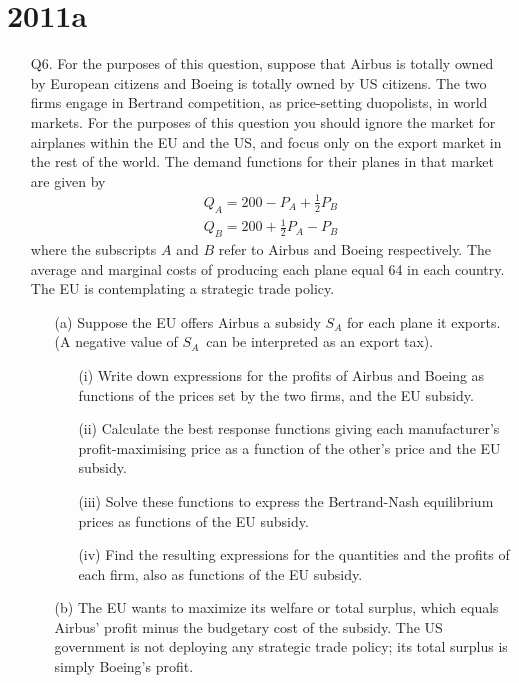 \newpage
\section{2011a}




\begin{enumerate}
	\item [Q6.] For the purposes of this question, suppose that Airbus is totally owned by European citizens and Boeing is totally owned by US citizens. The two firms engage in Bertrand competition, as price-setting duopolists, in world markets. For the purposes of this question you should ignore the market for airplanes within the EU and the US, and focus only on the export market in the rest of the world. The demand functions for their planes in that market are given by
	\begin{align*}
		Q_{A}=200-P_{A}+{\frac12} P_{B} \\ 
		Q_{B}=200+{\frac12}P_{A}-P_{B}
	\end{align*}
	where the subscripts $A$ and $B$ refer to Airbus and Boeing respectively.
	The average and marginal costs of producing each plane equal 64 in each
	country. The EU is contemplating a strategic trade policy.
	
	\begin{enumerate}
		\item [(a)] Suppose the EU offers Airbus a subsidy $S_{A}$ for each plane it exports. (A negative value of $S_{A}$\ can be interpreted as an export tax).
	\begin{enumerate}
		\item [(i)] Write down expressions for the profits of Airbus and Boeing as functions of the prices set by the two firms, and the EU subsidy. 
		\item [(ii)] Calculate the best response functions giving each manufacturer's profit-maximising price as a function of the other's price and the EU subsidy. 
		\item [(iii)] Solve these functions to express the Bertrand-Nash equilibrium prices as functions of the EU subsidy. 
		\item [(iv)] Find the resulting expressions for the quantities and the profits of each firm, also as functions of the EU subsidy.
		\end{enumerate}
	\item [(b)] The EU wants to maximize its welfare or total surplus, which equals Airbus' profit minus the budgetary cost of the subsidy. The US government is not deploying any strategic trade policy; its total surplus is simply Boeing's profit.
	

\end{enumerate}
\end{enumerate}
